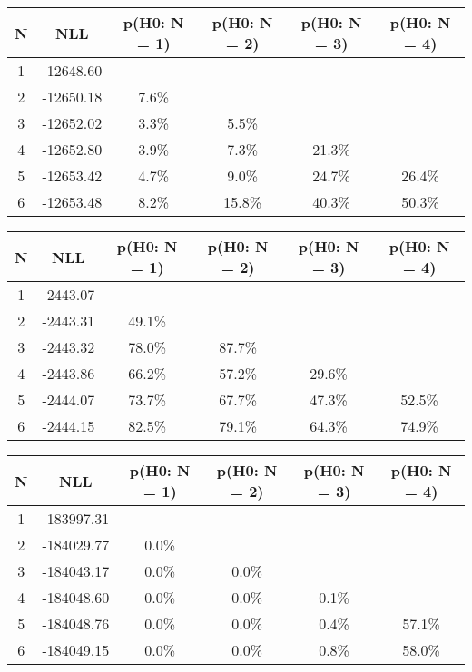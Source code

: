 \begin{table}[htb]
	\begin{center}
{\footnotesize\renewcommand{\arraystretch}{1.4}
		\begin{tabular}{cc||cccc}
			N & NLL & p(H0: N = 1) & p(H0: N = 2) & p(H0: N = 3) & p(H0: N = 4)\\ 
		\hline
1 & -12648.60 & & & & \\
2 & -12650.18 & 7.6\% & & & \\
3 & -12652.02 & 3.3\% & 5.5\% & & \\
4 & -12652.80 & 3.9\% & 7.3\% & 21.3\% & \\
5 & -12653.42 & 4.7\% & 9.0\% & 24.7\% & 26.4\% \\
6 & -12653.48 & 8.2\% & 15.8\% & 40.3\% & 50.3\% \\
	\end{tabular}
		\label{tab:lab}
	}
	\end{center}\end{table}

\begin{table}[htb]
	\begin{center}
{\footnotesize\renewcommand{\arraystretch}{1.4}
		\begin{tabular}{cc||cccc}
			N & NLL & p(H0: N = 1) & p(H0: N = 2) & p(H0: N = 3) & p(H0: N = 4)\\ 
		\hline
1 & -2443.07 & & & & \\
2 & -2443.31 & 49.1\% & & & \\
3 & -2443.32 & 78.0\% & 87.7\% & & \\
4 & -2443.86 & 66.2\% & 57.2\% & 29.6\% & \\
5 & -2444.07 & 73.7\% & 67.7\% & 47.3\% & 52.5\% \\
6 & -2444.15 & 82.5\% & 79.1\% & 64.3\% & 74.9\% \\
	\end{tabular}
		\label{tab:lab}
	}
	\end{center}\end{table}

\begin{table}[htb]
	\begin{center}
{\footnotesize\renewcommand{\arraystretch}{1.4}
		\begin{tabular}{cc||cccc}
			N & NLL & p(H0: N = 1) & p(H0: N = 2) & p(H0: N = 3) & p(H0: N = 4)\\ 
		\hline
1 & -183997.31 & & & & \\
2 & -184029.77 & 0.0\% & & & \\
3 & -184043.17 & 0.0\% & 0.0\% & & \\
4 & -184048.60 & 0.0\% & 0.0\% & 0.1\% & \\
5 & -184048.76 & 0.0\% & 0.0\% & 0.4\% & 57.1\% \\
6 & -184049.15 & 0.0\% & 0.0\% & 0.8\% & 58.0\% \\
	\end{tabular}
		\label{tab:lab}
	}
	\end{center}\end{table}

